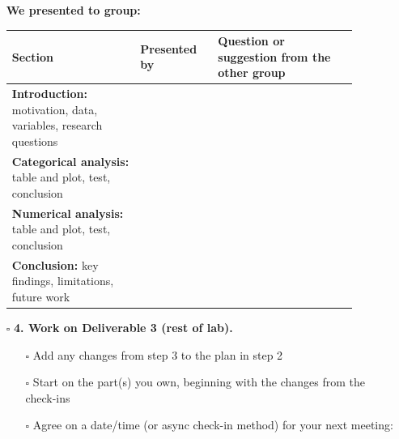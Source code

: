 \documentclass[12pt]{article}
\begin{document}
\begin{enumerate}
    \vspace{6pt}
    \noindent\textbf{We presented to group:} \underline{\hspace{0.4\linewidth}}

    \vspace{4pt}
    {\renewcommand{\arraystretch}{1.4}
    \noindent\begin{tabular}{>{\raggedright\arraybackslash}p{0.33\linewidth}|p{0.2\linewidth}|p{0.36\linewidth}}
    \toprule
    \textbf{Section} & \textbf{Presented by} & \textbf{Question or suggestion from the other group} \\
    \midrule
    \textbf{Introduction:} motivation, data, variables, research questions & & \\[0.3in]
    \hline
    \textbf{Categorical analysis:} table and plot, test, conclusion & & \\[0.3in]
    \hline
    \textbf{Numerical analysis:} table and plot, test, conclusion & & \\[0.3in]
    \hline
    \textbf{Conclusion:} key findings, limitations, future work & & \\[0.3in]
    \bottomrule
    \end{tabular}}

    \item[$\square$] \textbf{4. Work on Deliverable 3 (rest of lab).}
    \begin{itemize}[nosep]
        \item[$\square$] Add any changes from step 3 to the plan in step 2
        \item[$\square$] Start on the part(s) you own, beginning with the changes from the check-ins
        \item[$\square$] Agree on a date/time (or async check-in method) for your next meeting: \underline{\hspace{0.3\linewidth}}
    \end{itemize}
\end{enumerate}
\end{document}
